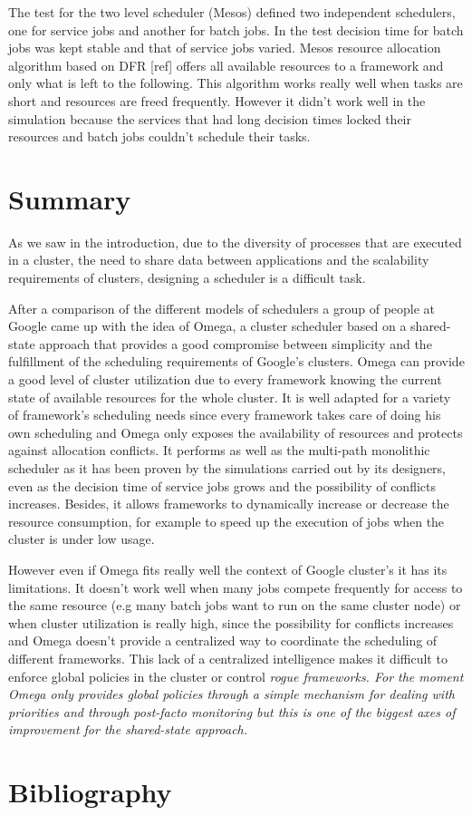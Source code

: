 \documentclass{svjour3}                     %
\begin{document}
The test for the two level scheduler (Mesos) defined two independent
schedulers, one for service jobs and another for batch jobs. In the
test decision time for batch jobs was kept stable and that of service
jobs varied. Mesos resource allocation algorithm based on DFR [ref]
offers all available resources to a framework and only what is left to
the following. This algorithm works really well when tasks are short
and resources are freed frequently. However it didn't work well in the
simulation because the services that had long decision times locked
their resources and batch jobs couldn't schedule their tasks.

\section{Summary}

As we saw in the introduction, due to the diversity of processes that
are executed in a cluster, the need to share data between applications
and the scalability requirements of clusters, designing a scheduler is
a difficult task.

After a comparison of the different models of schedulers a group of
people at Google came up with the idea of Omega, a cluster scheduler
based on a shared-state approach that provides a good compromise
between simplicity and the fulfillment of the scheduling requirements
of Google's clusters. Omega can provide a good level of cluster
utilization due to every framework knowing the current state of
available resources for the whole cluster. It is well adapted for a
variety of framework's scheduling needs since every framework takes
care of doing his own scheduling and Omega only exposes the
availability of resources and protects against allocation
conflicts. It performs as well as the multi-path monolithic scheduler
as it has been proven by the simulations carried out by its designers,
even as the decision time of service jobs grows and the possibility of
conflicts increases. Besides, it allows frameworks to dynamically
increase or decrease the resource consumption, for example to speed up
the execution of jobs when the cluster is under low usage.

However even if Omega fits really well the context of Google cluster's
it has its limitations. It doesn't work well when many jobs compete
frequently for access to the same resource (e.g many batch jobs want to run
on the same cluster node) or when cluster utilization is really high,
since the possibility for conflicts increases and Omega doesn't
provide a centralized way to coordinate the scheduling of different
frameworks. This lack of a centralized intelligence makes it difficult
to enforce global policies in the cluster or control \em{rogue}
frameworks. For the moment Omega only provides global policies through
a simple mechanism for dealing with priorities and through post-facto
monitoring but this is one of the biggest axes of improvement for the
shared-state approach.

\section{Bibliography}
\end{document}
